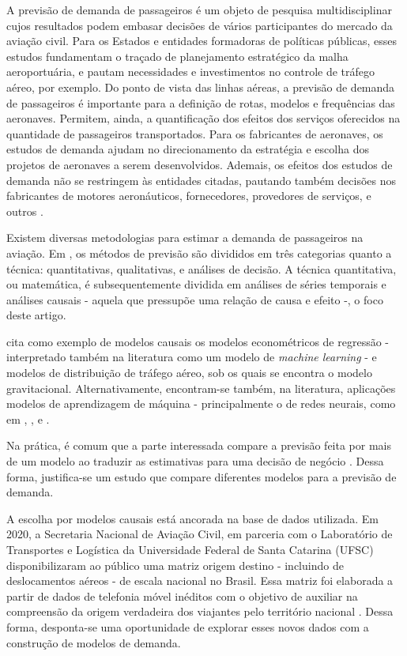 \documentclass[a4paper,9pt,twocolumn,twoside,]{pinp}
\begin{document}
A previsão de demanda de passageiros é um objeto de pesquisa
multidisciplinar cujos resultados podem embasar decisões de vários
participantes do mercado da aviação civil. Para os Estados e entidades
formadoras de políticas públicas, esses estudos fundamentam o traçado de
planejamento estratégico da malha aeroportuária, e pautam necessidades e
investimentos no controle de tráfego aéreo, por exemplo. Do ponto de
vista das linhas aéreas, a previsão de demanda de passageiros é
importante para a definição de rotas, modelos e frequências das
aeronaves. Permitem, ainda, a quantificação dos efeitos dos serviços
oferecidos na quantidade de passageiros transportados. Para os
fabricantes de aeronaves, os estudos de demanda ajudam no direcionamento
da estratégia e escolha dos projetos de aeronaves a serem desenvolvidos.
Ademais, os efeitos dos estudos de demanda não se restringem às
entidades citadas, pautando também decisões nos fabricantes de motores
aeronáuticos, fornecedores, provedores de serviços, e outros
\citep{icao_doc_2006}.

Existem diversas metodologias para estimar a demanda de passageiros na
aviação. Em \citet{icao_doc_2006}, os métodos de previsão são divididos
em três categorias quanto a técnica: quantitativas, qualitativas, e
análises de decisão. A técnica quantitativa, ou matemática, é
subsequentemente dividida em análises de séries temporais e análises
causais - aquela que pressupõe uma relação de causa e efeito -, o foco
deste artigo.

\citet{icao_doc_2006} cita como exemplo de modelos causais os modelos
econométricos de regressão - interpretado também na literatura como um
modelo de \emph{machine learning} \citep{erjongmanee_air_2018} - e
modelos de distribuição de tráfego aéreo, sob os quais se encontra o
modelo gravitacional. Alternativamente, encontram-se também, na
literatura, aplicações modelos de aprendizagem de máquina -
principalmente o de redes neurais, como em
\citet{blinova_analysis_2007}, \citet{alekseev_multivariate_2009}, e
\citet{pourebrahim_enhancing_2018}.

Na prática, é comum que a parte interessada compare a previsão feita por
mais de um modelo ao traduzir as estimativas para uma decisão de negócio
\citep{grosche_gravity_2007}. Dessa forma, justifica-se um estudo que
compare diferentes modelos para a previsão de demanda.

A escolha por modelos causais está ancorada na base de dados utilizada.
Em 2020, a Secretaria Nacional de Aviação Civil, em parceria com o
Laboratório de Transportes e Logística da Universidade Federal de Santa
Catarina (UFSC) disponibilizaram ao público uma matriz origem destino -
incluindo de deslocamentos aéreos - de escala nacional no Brasil. Essa
matriz foi elaborada a partir de dados de telefonia móvel inéditos com o
objetivo de auxiliar na compreensão da origem verdadeira dos viajantes
pelo território nacional
\citep{coordenacao-geral_de_planejamento_pesquisas_e_estudos_da_aviacao_civil_matriz_2020}.
Dessa forma, desponta-se uma oportunidade de explorar esses novos dados
com a construção de modelos de demanda.
\end{document}
